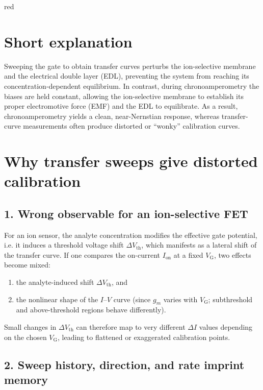 \begin{color}{red}
    \section*{Short explanation}

Sweeping the gate to obtain transfer curves perturbs the ion-selective membrane and the electrical double layer (EDL), preventing the system from reaching its concentration-dependent equilibrium.  
In contrast, during chronoamperometry the biases are held constant, allowing the ion-selective membrane to establish its proper electromotive force (EMF) and the EDL to equilibrate.  
As a result, chronoamperometry yields a clean, near-Nernstian response, whereas transfer-curve measurements often produce distorted or ``wonky'' calibration curves.

\section*{Why transfer sweeps give distorted calibration}

\subsection*{1. Wrong observable for an ion-selective FET}

For an ion sensor, the analyte concentration modifies the effective gate potential, i.e. it induces a threshold voltage shift $\Delta V_{\mathrm{th}}$, which manifests as a lateral shift of the transfer curve.
If one compares the on-current $I_{\mathrm{on}}$ at a fixed $V_{\mathrm{G}}$, two effects become mixed:
\begin{enumerate}
    \item the analyte-induced shift $\Delta V_{\mathrm{th}}$, and
    \item the nonlinear shape of the $I$--$V$ curve (since $g_m$ varies with $V_{\mathrm{G}}$; subthreshold and above-threshold regions behave differently).
\end{enumerate}
Small changes in $\Delta V_{\mathrm{th}}$ can therefore map to very different $\Delta I$ values depending on the chosen $V_{\mathrm{G}}$, leading to flattened or exaggerated calibration points.

\subsection*{2. Sweep history, direction, and rate imprint memory}


\end{color}
